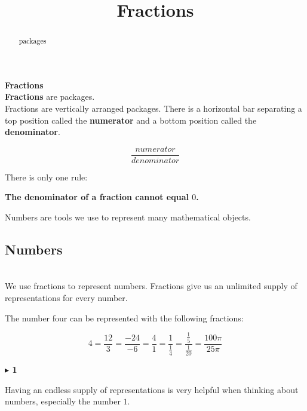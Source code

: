 \documentclass{ximera}
\title{Fractions}
\begin{document}
\begin{abstract}
packages
\end{abstract}
\maketitle



\begin{definition}  \textbf{\textcolor{green!50!black}{Fractions}} \\


\textbf{Fractions} are packages. \\


Fractions are vertically arranged packages.  There is a horizontal bar separating a top position called the \textbf{numerator} and a bottom position called the \textbf{denominator}.



\[
\frac{numerator}{denominator}
\]


There is only one rule:

\begin{center}
\textbf{\textcolor{red!70!black}{The denominator of a fraction cannot equal $0$.}}
\end{center}


\end{definition}


Numbers are tools we use to represent many mathematical objects.



\subsection*{Numbers} \\



We use fractions to represent numbers.  Fractions give us an unlimited supply of representations for every number.

The number four can be represented with the following fractions:

\[
4 = \frac{12}{3} = \frac{-24}{-6} = \frac{4}{1} = \frac{1}{\tfrac{1}{4}} = \frac{\tfrac{1}{5}}{\tfrac{1}{20}} = \frac{100\pi}{25\pi}
\]








\textbf{\textcolor{purple!85!blue}{$\blacktriangleright$ 1}} 



Having an endless supply of representations is very helpful when thinking about numbers, especially the number $1$. \\
\end{document}
